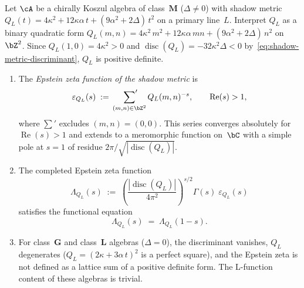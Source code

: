 \begin{theorem}
\label{thm:shadow-epstein-zeta}
\ClaimStatusProvedHere
{}
Let $\cA$ be a chirally Koszul algebra of class~$\mathbf{M}$
\textup{(}$\Delta \neq 0$\textup{)} with shadow metric
$Q_L(t) = 4\kappa^2 + 12\kappa\alpha\,t
+ (9\alpha^2 + 2\Delta)\,t^2$
on a primary line~$L$.
Interpret $Q_L$ as a binary quadratic form
$Q_L(m,n) = 4\kappa^2\,m^2 + 12\kappa\alpha\,mn
+ (9\alpha^2 + 2\Delta)\,n^2$
on $\bZ^2$.  Since $Q_L(1,0) = 4\kappa^2 > 0$ and
$\operatorname{disc}(Q_L) = -32\kappa^2\Delta < 0$
by~\eqref{eq:shadow-metric-discriminant},
$Q_L$ is positive definite.
\begin{enumerate}[label=\textup{(\roman*)}]
\item The \emph{Epstein zeta function of the shadow metric} is
\begin{equation}\label{eq:shadow-epstein-zeta}
  \varepsilon_{Q_L}(s)
  \;:=\;
  \sideset{}{'}\sum_{(m,n)\in\bZ^2}
  Q_L(m,n)^{-s},
  \qquad
  \operatorname{Re}(s) > 1,
\end{equation}
where $\sum'$ excludes $(m,n) = (0,0)$.
This series converges absolutely for $\operatorname{Re}(s) > 1$
and extends to a meromorphic function on~$\bC$ with a simple
pole at $s = 1$ of residue $2\pi/\sqrt{|\operatorname{disc}(Q_L)|}$.

\item The completed Epstein zeta function
\begin{equation}\label{eq:completed-shadow-epstein}
  \Lambda_{Q_L}(s)
  \;:=\;
  \left(\frac{|\operatorname{disc}(Q_L)|}{4\pi^2}\right)^{\!s/2}
  \!\Gamma(s)\;\varepsilon_{Q_L}(s)
\end{equation}
satisfies the functional equation
\begin{equation}\label{eq:shadow-epstein-fe}
  \Lambda_{Q_L}(s) \;=\; \Lambda_{Q_L}(1-s).
\end{equation}

\item For class~$\mathbf{G}$ and class~$\mathbf{L}$ algebras
\textup{(}$\Delta = 0$\textup{)},
the discriminant vanishes, $Q_L$ degenerates
\textup{(}$Q_L = (2\kappa + 3\alpha\,t)^2$ is a perfect
square\textup{)}, and the Epstein zeta is not defined
as a lattice sum of a positive definite form.
The L-function content of these algebras is trivial.
\end{enumerate}
\end{theorem}

